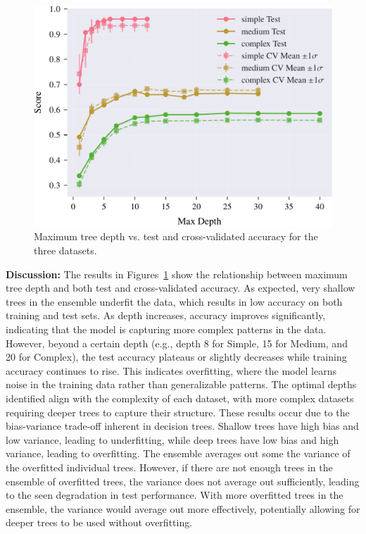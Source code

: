 \documentclass[conference]{IEEEtran}
\begin{document}
\begin{figure}[H]
  \centering
  \includegraphics[width=\linewidth]{images/all_datasets_depth_accuracy.pdf}
  \caption{Maximum tree depth vs. test and cross-validated accuracy for the three datasets.}
  \label{fig:exp1-depth-acc}
\end{figure}

\textbf{Discussion:}
 The results in Figures~\ref{fig:exp1-depth-acc} show the relationship between maximum tree depth and both test and cross-validated 
  accuracy. As expected, very shallow trees in the ensemble underfit the data, which results in low accuracy on both training and test sets. As depth 
  increases, accuracy improves significantly, indicating that the model is capturing more complex patterns in the data. However, beyond a certain depth 
  (e.g., depth 8 for Simple, 15 for Medium, and 20 for Complex), the test accuracy plateaus or slightly decreases while training accuracy 
  continues to rise. This indicates overfitting, where the model learns noise in the training data rather than generalizable patterns. The optimal 
  depths identified align with the complexity of each dataset, with more complex datasets requiring deeper trees to capture their structure. These results occur due to the bias-variance trade-off inherent in decision trees. Shallow trees have high bias and low variance, leading to 
  underfitting, while deep trees have low bias and high variance, leading to overfitting. The ensemble averages out some the variance of the overfitted individual 
  trees. However, if there are not enough trees in the ensemble of overfitted trees, the variance does not average out sufficiently, leading to the seen 
  degradation in test performance. With more overfitted trees in the ensemble, the variance would average out more effectively, potentially allowing for deeper trees to be
    used without overfitting. 
\end{document}
